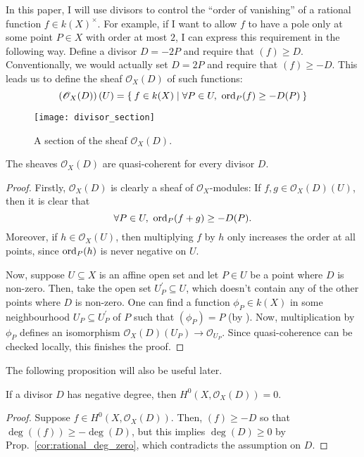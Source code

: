 In this paper, I will use divisors to control the ``order of vanishing'' of 
a rational function $f\in k(X)^{\times}$. For example, if I want to allow 
$f$ to have a pole only at some point $P\in X$ with order at most $2$,
I can express this requirement in the following way. Define a divisor
$D=-2P$ and require that $(f)\geq D$. Conventionally, we would actually
set $D=2P$ and require that $(f)\geq -D$. This leads us to define the
sheaf $\mathscr{O}_X(D)$ of such functions:
\[
  \left(\mathscr{O}_X(D)\right)(U)=\Set{f\in k(X)\mid
  \forall P\in U,\ \operatorname{ord}_{P}(f)\geq -D(P)}
\]
\begin{figure}[H]
  \centering
  \texttt{[image: divisor\_section]}
  \caption{A section of the sheaf $\mathscr{O}_X(D)$.}
\end{figure}
\begin{prop}
  The sheaves $\mathscr{O}_X(D)$ are quasi-coherent for every divisor $D$.
\end{prop}
\begin{proof}
  Firstly, $\mathscr{O}_X(D)$ is clearly a sheaf of $\mathscr{O}_{X}$-modules:
  If $f, g\in\mathscr{O}_X(D)(U)$, then it is clear that
  \[
    \forall P\in U,\ \ord_{P}(f+g)\geq -D(P).
  \]
  Moreover, if $h\in\mathscr{O}_{X}(U)$, then multiplying $f$ by $h$ only
  increases the order at all points, since $\operatorname{ord}_{P}(h)$ is never negative
  on $U$.

  Now, suppose $U\subseteq X$ is an affine open set and let $P\in U$ be a
  point where $D$ is non-zero. Then, take the open set
  $U_{P}^{\prime}\subseteq U$, which doesn't contain any of the other points
  where $D$ is non-zero. One can find a function $\phi_{P}\in k(X)$ in some
  neighbourhood $U_{P}\subseteq U_{P}^{\prime}$ of $P$ such that $(\phi_{P})=P$
  (by \cite[Lemma 7.5.6]{gathmann}). Now, multiplication by $\phi_{P}$
  defines an isomorphism $\mathscr{O}_X(D)(U_{P})\to \mathscr{O}_{U_{P}}$.
  Since quasi-coherence can be checked locally, this finishes the proof.
\end{proof}
The following proposition will also be useful later.
\begin{prop}\label{prop:global_sec_negative_divisor}
  If a divisor $D$ has negative degree, then $H^{0}(X,\mathscr{O}_X(D))=0$.
\end{prop}
\begin{proof}
  Suppose $f\in H^{0}(X,\mathscr{O}_X(D))$. Then, $(f)\geq -D$
  so that $\deg((f))\geq -\deg(D)$, but this implies $\deg(D)\geq 0$
  by Prop.~\ref{cor:rational_deg_zero}, which contradicts the assumption on
  $D$.
\end{proof}

